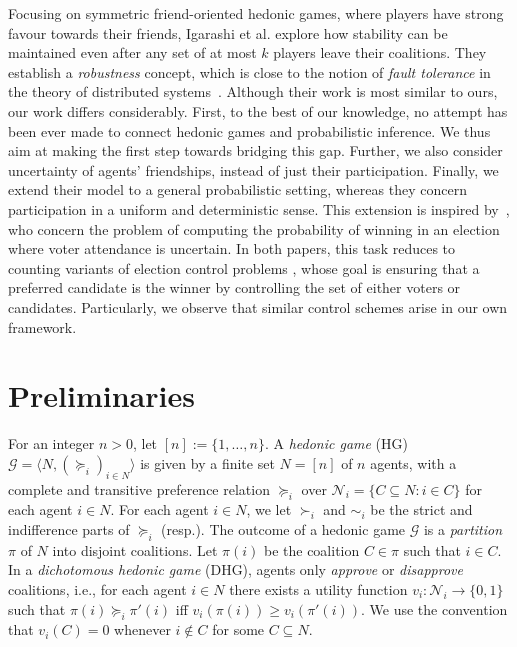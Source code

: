 \documentclass[letterpaper]{article} %
\begin{document}
Focusing on symmetric friend-oriented hedonic games, where players have strong favour towards their friends, Igarashi et al.  explore how stability can be maintained even after any set of at most $k$ players leave their coalitions. They establish a \textit{robustness} concept, which is close to the notion of \textit{fault tolerance} in the theory of distributed systems~\cite{fedoruk2002improving}. Although their work is most similar to ours, our work differs considerably. First, to the best of our knowledge, no attempt has been ever made to connect hedonic games and probabilistic inference. We thus aim at making the first step towards bridging this gap. Further, we also consider uncertainty of agents’ friendships, instead of just their participation. Finally, we extend their model to a general probabilistic setting, whereas they concern participation in a uniform and deterministic sense. This extension is inspired by~\cite{imber2021probabilistic,wojtas2012possible}, who concern the problem of computing the probability of winning in an election where voter attendance is uncertain. In both papers, this task reduces to counting variants of election control problems \cite{bartholdi1992hard}, whose goal is ensuring that a preferred candidate is the winner by controlling the set of either voters or candidates. Particularly, we observe that similar control schemes arise in our own framework.

\section{Preliminaries}
\label{sec:Preliminaries}
For an integer $n > 0$, let $[n] := \{1,\dots,n\}$. 
A \textit{hedonic game} (HG) $\mathcal{G} = \langle N, (\succeq_i)_{i \in N} \rangle$ is given by a finite set $N = [n]$ of $n$ agents, with a complete and transitive preference relation $\succeq_i$ over $\mathcal{N}_i = \{C \subseteq N : i \in C\}$ for each agent $i \in N$. For each agent $i \in N$, we let $\succ_i$ and $\sim_i$ be the strict and indifference parts of $\succeq_i$ (resp.). The outcome of a hedonic game $\mathcal{G}$ is a \textit{partition} $\pi$ of $N$ into disjoint coalitions. Let $\pi(i)$ be the coalition $C \in \pi$ such that $i \in C$. In a \textit{dichotomous hedonic game} (DHG), agents only \textit{approve} or \textit{disapprove} coalitions, i.e., for each agent $i \in N$ there exists a utility function $v_i: \mathcal{N}_i \rightarrow \{0,1\}$ such that $\pi(i) \succeq_i \pi'(i)$ iff $v_i(\pi(i)) \geq v_i(\pi'(i))$. We use the convention that $v_i(C) = 0$ whenever $i \notin C$ for some $C \subseteq N$. 
%
\end{document}
